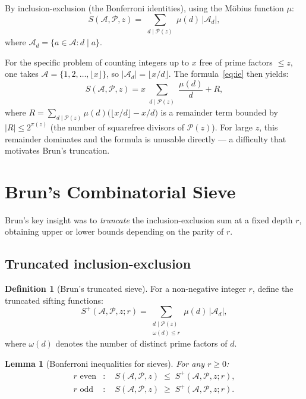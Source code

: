 \documentclass[12pt,a4paper]{amsart}
\newtheorem{lemma}[theorem]{Lemma}
\theoremstyle{definition}
\newtheorem{definition}[theorem]{Definition}
\begin{document}
By inclusion-exclusion (the Bonferroni identities), using the M\"obius function
$\mu$:
\begin{equation}\label{eq:ie}
  S(\mathcal{A}, \mathcal{P}, z)
  = \sum_{\substack{d \mid \mathcal{P}(z)}} \mu(d)\, |\mathcal{A}_d|,
\end{equation}
where $\mathcal{A}_d = \{a \in \mathcal{A} : d \mid a\}$.

For the specific problem of counting integers up to $x$ free of prime
factors $\leq z$, one takes $\mathcal{A} = \{1, 2, \ldots, \lfloor x \rfloor\}$,
so $|\mathcal{A}_d| = \lfloor x/d \rfloor$.  The formula~\eqref{eq:ie} then
yields:
\[
  S(\mathcal{A}, \mathcal{P}, z)
  = x \sum_{\substack{d \mid \mathcal{P}(z)}} \frac{\mu(d)}{d}
  + R,
\]
where $R = \sum_{d \mid \mathcal{P}(z)} \mu(d)\bigl(\lfloor x/d \rfloor - x/d\bigr)$
is a remainder term bounded by $|R| \leq 2^{\pi(z)}$ (the number of
squarefree divisors of $\mathcal{P}(z)$).  For large $z$, this remainder
dominates and the formula is unusable directly --- a difficulty that
motivates Brun's truncation.

\section{Brun's Combinatorial Sieve}
\label{sec:sieve}

Brun's key insight was to \emph{truncate} the inclusion-exclusion sum at
a fixed depth $r$, obtaining upper or lower bounds depending on the parity
of $r$.

\subsection{Truncated inclusion-exclusion}

\begin{definition}[Brun's truncated sieve]
  For a non-negative integer $r$, define the truncated sifting functions:
  \[
    S^+(\mathcal{A}, \mathcal{P}, z; r)
    = \sum_{\substack{d \mid \mathcal{P}(z) \\ \omega(d) \leq r}} \mu(d)\, |\mathcal{A}_d|,
  \]
  where $\omega(d)$ denotes the number of distinct prime factors of $d$.
\end{definition}

\begin{lemma}[Bonferroni inequalities for sieves]\label{lem:bonferroni}
  For any $r \geq 0$:
  \begin{align*}
    r \text{ even} &: \quad S(\mathcal{A}, \mathcal{P}, z) \;\leq\; S^+(\mathcal{A}, \mathcal{P}, z; r), \\
    r \text{ odd}  &: \quad S(\mathcal{A}, \mathcal{P}, z) \;\geq\; S^+(\mathcal{A}, \mathcal{P}, z; r).
  \end{align*}
\end{lemma}
\end{document}
